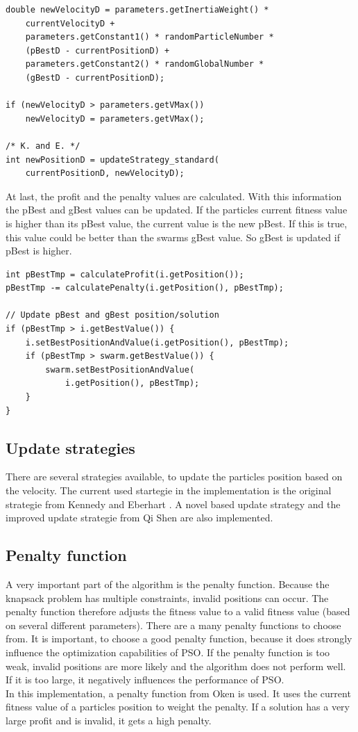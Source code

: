 \documentclass{article}
\begin{document}
\begin{lstlisting}[caption="Solver.cpp"]
double newVelocityD = parameters.getInertiaWeight() *
	currentVelocityD +
	parameters.getConstant1() * randomParticleNumber *
	(pBestD - currentPositionD) +
	parameters.getConstant2() * randomGlobalNumber *
	(gBestD - currentPositionD);

if (newVelocityD > parameters.getVMax())
	newVelocityD = parameters.getVMax();

/* K. and E. */
int newPositionD = updateStrategy_standard(
	currentPositionD, newVelocityD);
\end{lstlisting}

At last, the profit and the penalty values are calculated. With this information the pBest and gBest values can be updated. If the particles current fitness value is higher than its pBest value, the current value is the new pBest. If this is true, this value could be better than the swarms gBest value. So gBest is updated if pBest is higher.

\begin{lstlisting}[caption="Solver.cpp"]
int pBestTmp = calculateProfit(i.getPosition());
pBestTmp -= calculatePenalty(i.getPosition(), pBestTmp);

// Update pBest and gBest position/solution
if (pBestTmp > i.getBestValue()) {
	i.setBestPositionAndValue(i.getPosition(), pBestTmp);
	if (pBestTmp > swarm.getBestValue()) {
	    swarm.setBestPositionAndValue(
	    	i.getPosition(), pBestTmp);
	}
}
\end{lstlisting}

\subsection{Update strategies}
There are several strategies available, to update the particles position based on the velocity. The current used startegie in the implementation is the original strategie from Kennedy and Eberhart \cite{bib-discrete}. A novel based update strategy \cite{bib-novel} and the improved update strategie from Qi Shen are also implemented.

\subsection{Penalty function}
A very important part of the algorithm is the penalty function. Because the knapsack problem has multiple constraints, invalid positions can occur. The penalty function therefore adjusts the fitness value to a valid fitness value (based on several different parameters). There are a many penalty functions to choose from. It is important, to choose a good penalty function, because it does strongly influence the optimization capabilities of PSO. If the penalty function is too weak, invalid positions are more likely and the algorithm does not perform well. If it is too large, it negatively influences the performance of PSO.\\
In this implementation, a penalty function from Oken \cite{bib-penalty} is used. It uses the current fitness value of a particles position to weight the penalty. If a solution has a very large profit and is invalid, it gets a high penalty.
\end{document}
